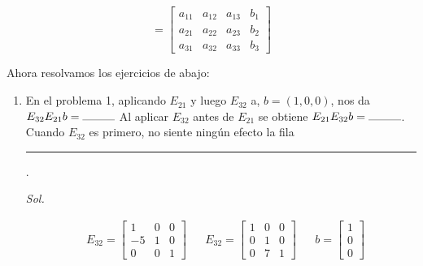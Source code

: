 \begin{equation}
	[A,b]= \begin{bmatrix}
		a_{11} & a_{12} & a_{13} & b_1\\
		a_{21} & a_{22} & a_{23} & b_2\\
		a_{31} & a_{32} & a_{33} & b_{3}
	\end{bmatrix}
\end{equation}

Ahora resolvamos los ejercicios de abajo:

\begin{enumerate}

	\item En el problema 1, aplicando $E_{21}$ y luego $E_{32}$ a, $b = (1,0,0)$, nos da $E_{32}E_{21}b = \rule{10mm}{0.1mm}$ Al aplicar $E_{32}$ antes de $E_{21}$ se obtiene $E_{21}E_{32}b=\rule{10mm}{0.1mm}$. Cuando $E_{32}$ es primero,
	      no siente ningún efecto la fila\rule{10mm}{0.1mm}.

	      \textit{ Sol. }

	      \begin{align*}
		       & E_{32}= \begin{bmatrix} 1& 0& 0\\ -5& 1& 0 \\0& 0& 1 \end{bmatrix} &  & E_{32}= \begin{bmatrix} 1& 0& 0\\ 0& 1& 0 \\0& 7&1 \end{bmatrix} &  & b=\begin{bmatrix}
			                                                                                                                                                         1 \\0\\0
		                                                                                                                                                         \end{bmatrix}
	      \end{align*}


\end{enumerate}
